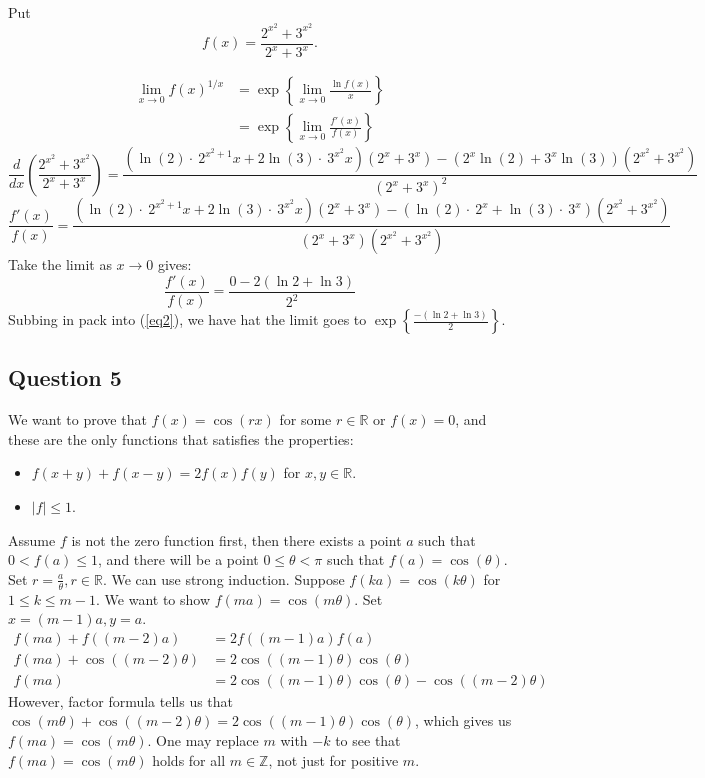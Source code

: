 \documentclass{article}
\begin{document}
Put 
\begin{equation*}
    f(x) = \frac{2^{x^2} + 3^{x^2}}{2^x+3^x}.
\end{equation*}

\begin{align}
\nonumber
    \lim_{x \to 0} f(x)^{1/x} &= \exp\left\{\lim_{x \to 0} \frac{\ln f(x)}{x} \right\}\\
    &= \exp\left\{\lim_{x \to 0} \frac{f'(x)}{f(x)} \right\} \label{eq2}
\end{align}
\begin{equation*}
    \frac{d}{dx}\left(\frac{2^{x^2}+3^{x^2}}{2^x+3^x}\right)=\frac{\left(\ln \left(2\right)\cdot \:2^{x^2+1}x+2\ln \left(3\right)\cdot \:3^{x^2}x\right)\left(2^x+3^x\right)-\left(2^x\ln \left(2\right)+3^x\ln \left(3\right)\right)\left(2^{x^2}+3^{x^2}\right)}{\left(2^x+3^x\right)^2}
\end{equation*}
\begin{equation*}
    \frac{f'(x)}{f(x)}= \frac{\left(\ln \left(2\right)\cdot \:2^{x^2+1}x+2\ln \left(3\right)\cdot \:3^{x^2}x\right)\left(2^x+3^x\right)-\left(\ln \left(2\right)\cdot \:2^x+\ln \left(3\right)\cdot \:3^x\right)\left(2^{x^2}+3^{x^2}\right)}{\left(2^x+3^x\right)\left(2^{x^2}+3^{x^2}\right)}
\end{equation*}
Take the limit as $x \to 0$ gives:
\begin{equation*}
    \frac{f'(x)}{f(x)}= \frac{0-2(\ln2 + \ln3)}{2^2 }
\end{equation*}
Subbing in pack into (\ref{eq2}), we have hat the limit goes to $\exp\left\{\frac{-(\ln 2 + \ln3)}{2}\right\}$.

\subsection*{Question 5}
We want to prove that $f(x)=\cos(rx)$ for some $r \in \mathbb{R}$ or $f(x)=0$, and these are the only functions that satisfies the properties:
\begin{itemize}
    \item $f(x+y)+f(x-y)=2f(x)f(y)$ for $x,y \in \mathbb{R}$.
    \item $|f| \leq 1$.
\end{itemize}
Assume $f$ is not the zero function first, then there exists a point $a$ such that $0 < f(a) \leq 1$, and there will be a point $0 \leq \theta < \pi$ such that $f(a) = \cos(\theta)$. Set $r=\frac{a}{\theta},r \in \mathbb{R}$. We can use strong induction. Suppose $f(ka)=\cos(k\theta)$ for $1 \leq k \leq m-1$. We want to show $f(ma)=\cos(m\theta)$. Set $x=(m-1)a, y=a$. 
\begin{align*}
    f(ma)  + f((m-2)a) &= 2f((m-1)a)f(a) \\
    f(ma) + \cos((m-2)\theta) &= 2\cos((m-1)\theta)\cos(\theta) \\
    f(ma) &= 2\cos((m-1)\theta)\cos(\theta) - \cos((m-2)\theta) 
\end{align*}
However, factor formula tells us that $\cos(m\theta) + \cos((m-2)\theta) = 2\cos((m-1)\theta)\cos(\theta)$, which gives us $f(ma) = \cos(m\theta)$. One may replace $m$ with $-k$ to see that $f(ma) = \cos(m\theta)$ holds for all $m \in \mathbb{Z}$, not just for positive $m$. 
\end{document}
